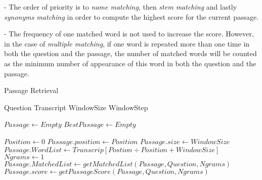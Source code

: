 - The order of priority is to \textit{name matching}, then \textit{stem matching} and lastly \textit{synonyms matching} in order to compute the highest score for the current passage.

- The frequency of one matched word is not used to increase the score. However, in the case of \textit{multiple matching}, if one word is repeated more than one time in both the question and the passage, the number of matched words will be counted as the minimum number of appearance of this word in both the question and the passage. 



\newpage


\begin{algorithm}                      %
\caption{Passage Retrieval}          %
\label{algo: Passage Retrieval}                           %
\begin{algorithmic}       [1]             %
\scriptsize
\REQUIRE Question 
\REQUIRE Transcript 
\REQUIRE WindowSize 
\REQUIRE WindowStep 

\STATE $Passage \gets Empty$ 
\STATE $BestPassage \gets Empty$ 

\STATE $Position \gets 0$ 
	\STATE $Passage.position \gets Position$ 
	\STATE $Passage.size \gets WindowSize$   
	\STATE $Passage.WordList \gets Transcrip[Postion \div Position+WindowSize]$ 
	\STATE $Ngrams \gets 1$ 	
	\STATE $Passage.MatchedList \gets getMatchedList(Passage,Question,Ngrams)$ 
	\STATE $Passage.score \gets getPassageScore(Passage,Question,Ngrams)$ 
	

\end{algorithmic}
\end{algorithm}
